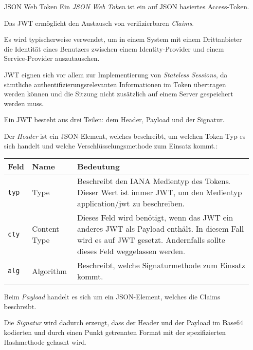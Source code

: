 \begin{defi}{JSON Web Token}
    Ein \emph{JSON Web Token} ist ein auf JSON basiertes Access-Token.

    Das JWT ermöglicht den Austausch von verifizierbaren \emph{Claims}.

    Es wird typischerweise verwendet, um in einem System mit einem Drittanbieter die Identität eines Benutzers zwischen einem Identity-Provider und einem Service-Provider auszutauschen.

    JWT eignen sich vor allem zur Implementierung von \emph{Stateless Sessions}, da sämtliche authentifizierungsrelevanten Informationen im Token übertragen werden können und die Sitzung nicht zusätzlich auf einem Server gespeichert werden muss.

    Ein JWT besteht aus drei Teilen: dem Header, Payload und der Signatur.

    Der \emph{Header} ist ein JSON-Element, welches beschreibt, um welchen Token-Typ es sich handelt und welche Verschlüsselungsmethode zum Einsatz kommt.:

    \begin{tabularx}{\textwidth}{|l|l|X|}
        \hline
        Feld         & Name         & Bedeutung                                                                                                                                                               \\
        \hline
        \hline
        \texttt{typ} & Type         & Beschreibt den IANA Medientyp des Tokens. Dieser Wert ist immer JWT, um den Medientyp application/jwt zu beschreiben.                                                   \\
        \hline
        \texttt{cty} & Content Type & Dieses Feld wird benötigt, wenn das JWT ein anderes JWT als Payload enthält. In diesem Fall wird es auf JWT gesetzt. Andernfalls sollte dieses Feld weggelassen werden. \\
        \hline
        \texttt{alg} & Algorithm    & Beschreibt, welche Signaturmethode zum Einsatz kommt.                                                                                                                   \\
        \hline
    \end{tabularx}

    Beim \emph{Payload} handelt es sich um ein JSON-Element, welches die Claims beschreibt.

    Die \emph{Signatur} wird dadurch erzeugt, dass der Header und der Payload im Base64 kodierten und durch einen Punkt getrennten Format mit der spezifizierten Hashmethode gehasht wird.
\end{defi}

